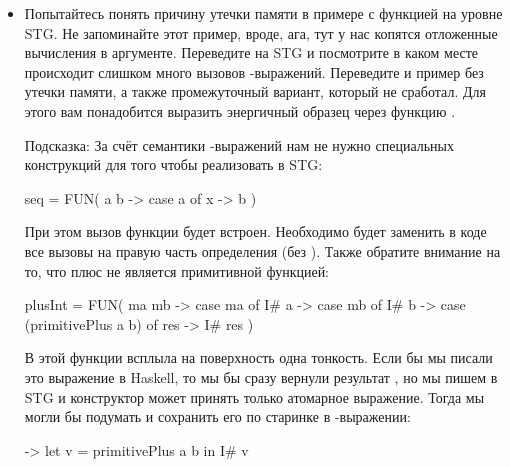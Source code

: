 \begin{itemize}
\item
  Попытайтесь понять причину утечки памяти в примере с функцией
   на уровне STG. Не запоминайте этот пример, вроде, ага, тут у
  нас копятся отложенные вычисления в аргументе. Переведите на STG и
  посмотрите в каком месте происходит слишком много вызовов
  -выражений. Переведите и пример без утечки памяти, а также
  промежуточный вариант, который не сработал. Для этого вам понадобится
  выразить энергичный образец через функцию .

  Подсказка: За счёт семантики -выражений нам не нужно
  специальных конструкций для того чтобы реализовать  в STG:


  \begin{code}
  seq = FUN( a b ->
          case a of
              x -> b
        )
  \end{code}

  При этом вызов функции  будет встроен. Необходимо будет
  заменить в коде все вызовы  на правую часть определения (без
  ). Также обратите внимание на то, что плюс не является
  примитивной функцией:


  \begin{code}
  plusInt = FUN( ma mb ->
              case ma of
                  I# a -> case mb of
                              I# b -> case (primitivePlus a b) of
                                          res -> I# res
            )
  \end{code}

  В этой функции всплыла на поверхность одна тонкость. Если бы мы писали
  это выражение в Haskell, то мы бы сразу вернули результат
  , но мы пишем в STG и конструктор
  может принять только атомарное выражение. Тогда мы могли бы подумать и
  сохранить его по старинке в -выражении:


  \begin{code}
  -> let v = primitivePlus a b
     in  I# v 
  \end{code}


\end{itemize}
